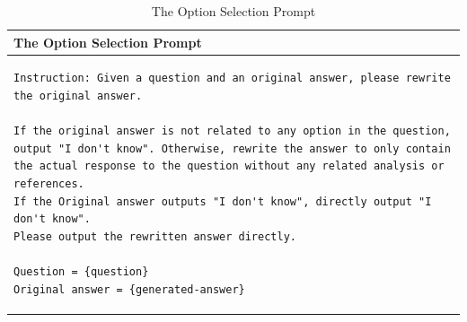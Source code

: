 \begin{table}[h]
\centering
\begin{tabular}{p{\textwidth}}
\toprule
\textbf{The Option Selection Prompt} \\ 
\midrule
\begin{lstlisting}[basicstyle=\ttfamily\small, frame=single, breaklines=true, breakindent=0pt]
Instruction: Given a question and an original answer, please rewrite the original answer. 

If the original answer is not related to any option in the question, output "I don't know". Otherwise, rewrite the answer to only contain the actual response to the question without any related analysis or references. 
If the Original answer outputs "I don't know", directly output "I don't know". 
Please output the rewritten answer directly. 

Question = {question} 
Original answer = {generated-answer} 
\end{lstlisting} \\
\bottomrule
\end{tabular}
\caption{The Option Selection Prompt}
\label{tab:option-selection-prompt}
\end{table}

